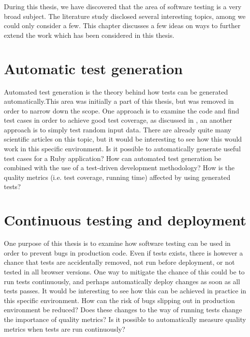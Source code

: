 
During this thesis, we have discovered that the area of software testing
is a very broad subject. The literature study disclosed several
interesting topics, among we could only consider a few. This chapter
discusses a few ideas on ways to further extend the work which has been
considered in this thesis.\\


\section{Automatic test generation}

 Automated test generation is the theory behind how tests can be
generated automatically.This area was initially a part of this thesis,
but was removed in order to narrow down the scope. One approach is to
examine the code and find test cases in order to achieve good test
coverage, as discussed in , an another
approach is to simply test random input data. There are already quite
many scientific articles on this topic, but it would be interesting to
see how this would work in this specific environment. Is it possible to
automatically generate useful test cases for a Ruby application? How can
automated test generation be combined with the use of a test-driven
development methodology? How is the quality metrics (i.e. test coverage,
running time) affected by using generated tests?\\


\section{Continuous testing and deployment}

One purpose of this thesis is to examine how software testing can be
used in order to prevent bugs in production code. Even if tests exists,
there is however a chance that tests are accidentally removed, not run
before deployment, or not tested in all browser versions. One way to
mitigate the chance of this could be to run tests continuously, and
perhaps automatically deploy changes as soon as all tests passes. It
would be interesting to see how this can be achieved in practice in this
specific environment. How can the risk of bugs slipping out in
production environment be reduced? Does these changes to the way of running
tests change the importance of quality metrics? Is it possible to automatically
measure quality metrics when tests are run continuously?\\
